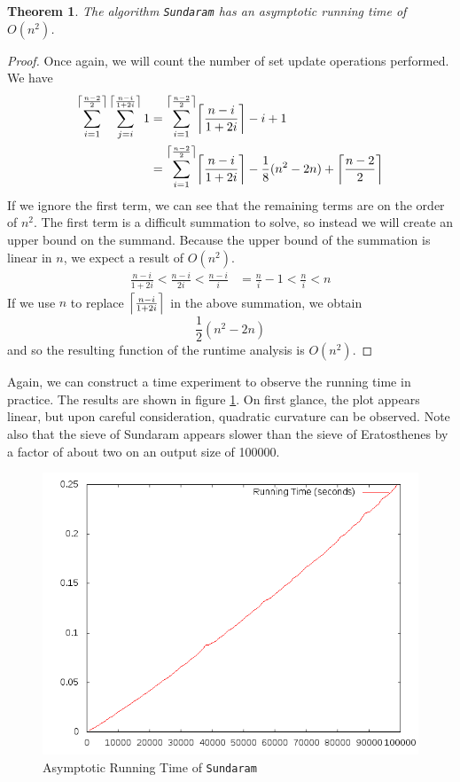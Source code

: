 \documentclass{amsart}
\DeclarePairedDelimiter{\ceil}{\lceil}{\rceil}
\newtheorem{thm}{Theorem}
\theoremstyle{definition}
\theoremstyle{case}
\begin{document}
	\begin{thm}
		The algorithm \texttt{Sundaram} has an asymptotic running time of $O(n^2)$.
	\end{thm}
	\begin{proof}
		Once again, we will count the number of set update operations performed. We have
		\begin{equation*}
		\begin{split}
		\sum_{i=1}^{\ceil*{\frac{n-2}{2}}} \sum_{j=i}^{\ceil*{\frac{n-i}{1+2i}}} 1 & = \sum_{i=1}^{\ceil*{\frac{n-2}{2}}} \ceil*{\frac{n-i}{1+2i}} - i + 1 \\
		& = \sum_{i=1}^{\ceil*{\frac{n-2}{2}}} \ceil*{\frac{n-i}{1+2i}} - \frac{1}{8}(n^2-2n) + \ceil*{\frac{n-2}{2}}
		\end{split}
		\end{equation*}
		If we ignore the first term, we can see that the remaining terms are on the order of $n^2$. The first term is a difficult summation to solve, so instead we will create an upper bound on the summand. Because the upper bound of the summation is linear in $n$, we expect a result of $O(n^2)$.
		\begin{equation*}
		\begin{split}
		\frac{n-i}{1+2i} < \frac{n-i}{2i} < \frac{n-i}{i} & = \frac{n}{i} - 1 < \frac{n}{i} < n
		\end{split}
		\end{equation*}
		If we use $n$ to replace $\ceil*{\frac{n-i}{1+2i}}$ in the above summation, we obtain
		$$\frac{1}{2}(n^2 - 2n)$$
		and so the resulting function of the runtime analysis is $O(n^2)$.
	\end{proof}
	
	Again, we can construct a time experiment to observe the running time in practice. The results are shown in figure \ref{runtime2}. On first glance, the plot appears linear, but upon careful consideration, quadratic curvature can be observed. Note also that the sieve of Sundaram appears slower than the sieve of Eratosthenes by a factor of about two on an output size of 100000.
	
	\begin{figure}\caption{Asymptotic Running Time of \texttt{Sundaram}}
		\label{runtime2}
		\includegraphics[scale=0.5]{sund2.png}
	\end{figure}
	
\end{document}
